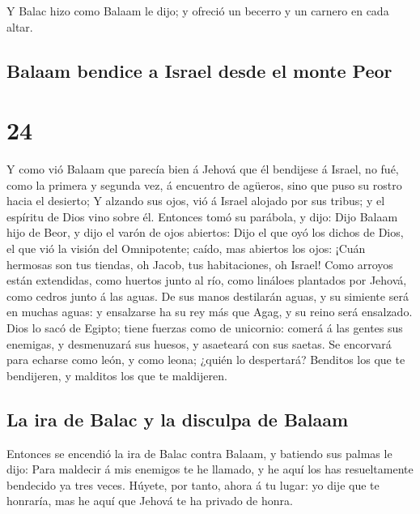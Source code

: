 Y Balac hizo como Balaam le dijo; y ofreció un becerro y
un carnero en cada altar.

\hypertarget{balaam-bendice-a-israel-desde-el-monte-peor}{%
\subsection{Balaam bendice a Israel desde el monte
Peor}\label{balaam-bendice-a-israel-desde-el-monte-peor}}

\hypertarget{section-23}{%
\section{24}\label{section-23}}

 Y como vió Balaam que parecía bien á Jehová que él
bendijese á Israel, no fué, como la primera y segunda vez, á encuentro
de agüeros, sino que puso su rostro hacia el desierto;  Y
alzando sus ojos, vió á Israel alojado por sus tribus; y el espíritu de
Dios vino sobre él.  Entonces tomó su parábola, y dijo: Dijo
Balaam hijo de Beor, y dijo el varón de ojos abiertos:  Dijo
el que oyó los dichos de Dios, el que vió la visión del Omnipotente;
caído, mas abiertos los ojos:  ¡Cuán hermosas son tus
tiendas, oh Jacob, tus habitaciones, oh Israel!  Como
arroyos están extendidas, como huertos junto al río, como lináloes
plantados por Jehová, como cedros junto á las aguas.  De sus
manos destilarán aguas, y su simiente será en muchas aguas: y ensalzarse
ha su rey más que Agag, y su reino será ensalzado.  Dios lo
sacó de Egipto; tiene fuerzas como de unicornio: comerá á las gentes sus
enemigas, y desmenuzará sus huesos, y asaeteará con sus saetas.
 Se encorvará para echarse como león, y como leona; ¿quién
lo despertará? Benditos los que te bendijeren, y malditos los que te
maldijeren.

\hypertarget{la-ira-de-balac-y-la-disculpa-de-balaam}{%
\subsection{La ira de Balac y la disculpa de
Balaam}\label{la-ira-de-balac-y-la-disculpa-de-balaam}}

 Entonces se encendió la ira de Balac contra Balaam, y
batiendo sus palmas le dijo: Para maldecir á mis enemigos te he llamado,
y he aquí los has resueltamente bendecido ya tres veces. 
Húyete, por tanto, ahora á tu lugar: yo dije que te honraría, mas he
aquí que Jehová te ha privado de honra.

